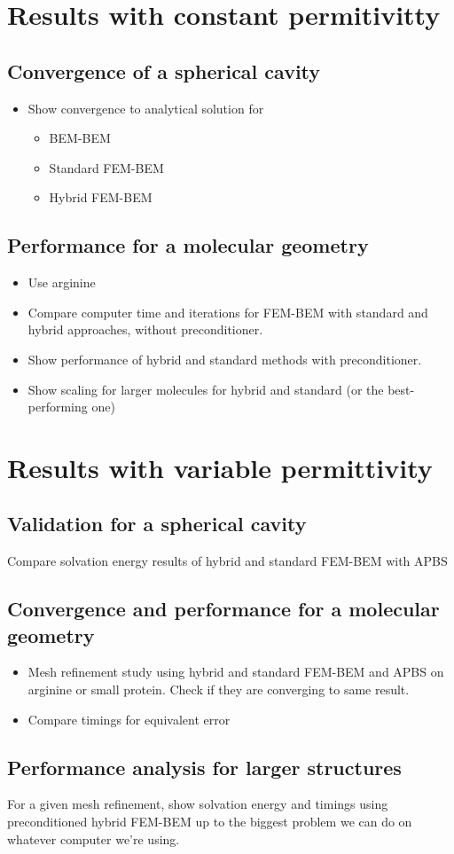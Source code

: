 \section*{\sffamily \Large Results with constant permitivitty}

\subsection*{\sffamily \large Convergence of a spherical cavity}
\begin{itemize}
    \item Show convergence to analytical solution for
    \begin{itemize}
        \item BEM-BEM
        \item Standard FEM-BEM
        \item Hybrid FEM-BEM
    \end{itemize}
\end{itemize}

\subsection*{\sffamily \large Performance for a molecular geometry}
\begin{itemize}
    \item Use arginine 
    \item Compare computer time and iterations for FEM-BEM with standard and hybrid approaches, without preconditioner. 
    \item Show performance of hybrid and standard methods with preconditioner.
    \item Show scaling for larger molecules for hybrid and standard (or the best-performing one)
\end{itemize}

\section*{\sffamily \Large Results with variable permittivity}

\subsection*{\sffamily \large Validation for a spherical cavity}

Compare solvation energy results of hybrid and standard FEM-BEM with APBS

\subsection*{\sffamily \large Convergence and performance for a molecular geometry}
\begin{itemize}
    \item Mesh refinement study using hybrid and standard FEM-BEM and APBS on arginine or small protein. Check if they are converging to same result.
    \item Compare timings for equivalent error
\end{itemize}

\subsection*{\sffamily \large Performance analysis for larger structures}

For a given mesh refinement, show solvation energy and timings using preconditioned hybrid FEM-BEM up to the biggest problem we can do on whatever computer we're using.
